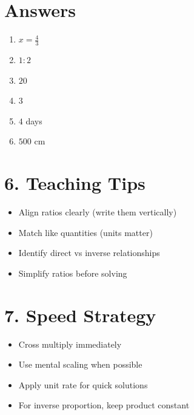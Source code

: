 \section*{Answers}
\begin{enumerate}
    \item $x = \frac{4}{3}$
    \item $1:2$
    \item $20$
    \item $3$
    \item $4$ days
    \item $500$ cm
\end{enumerate}

\section*{6. Teaching Tips}
\begin{itemize}
    \item Align ratios clearly (write them vertically)
    \item Match like quantities (units matter)
    \item Identify direct vs inverse relationships
    \item Simplify ratios before solving
\end{itemize}

\section*{7. Speed Strategy}
\begin{itemize}
    \item Cross multiply immediately
    \item Use mental scaling when possible
    \item Apply unit rate for quick solutions
    \item For inverse proportion, keep product constant
\end{itemize}
